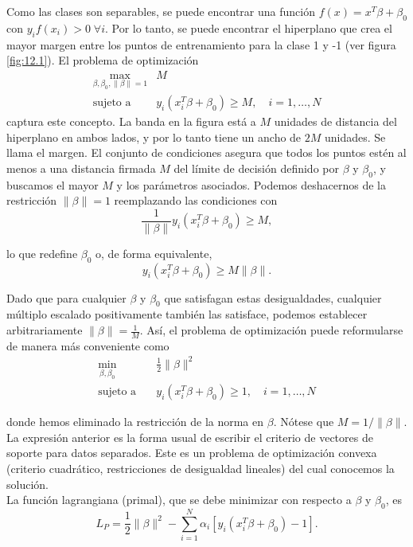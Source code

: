 Como las clases son separables, se puede encontrar una función $f(x) = x^T\beta + \beta_0$ con $y_i f(x_i) > 0 \; \forall i$. Por lo tanto, se puede encontrar el hiperplano que crea el mayor margen entre los puntos de entrenamiento para la clase 1 y -1 (ver figura \ref{fig:12.1}). El problema de optimización 
\begin{align}
\max_{\beta, \beta_0, \|\beta\|=1} & M \\
\text{sujeto a} \quad & y_i (x_i^T \beta + \beta_0) \geq M, \quad i = 1, \ldots, N
\end{align}
captura este concepto. La banda en la figura está a $M$ unidades de distancia del hiperplano en ambos lados, y por lo tanto tiene un ancho de $2M$ unidades. Se llama el margen. El conjunto de condiciones asegura que todos los puntos estén al menos a una distancia firmada $M$ del límite de decisión definido por $\beta$ y $\beta_0$, y buscamos el mayor $M$ y los parámetros asociados. Podemos deshacernos de la restricción $\|\beta\| = 1$ reemplazando las condiciones con
\begin{equation}
\frac{1}{\|\beta\|} y_i (x_i^T \beta + \beta_0) \geq M,
\end{equation}

\noindent lo que redefine $\beta_0$ o, de forma equivalente,
\begin{equation}
y_i (x_i^T \beta + \beta_0) \geq M \|\beta\|.
\end{equation}

Dado que para cualquier $\beta$ y $\beta_0$ que satisfagan estas desigualdades, cualquier múltiplo escalado positivamente también las satisface, podemos establecer arbitrariamente $\|\beta\| = \frac{1}{M}$. Así, el problema de optimización puede reformularse de manera más conveniente como
\begin{align}
\min_{\beta, \beta_0} & \frac{1}{2} \|\beta\|^2 \\
\text{sujeto a} \quad & y_i (x_i^T \beta + \beta_0) \geq 1, \quad i = 1, \ldots, N
\end{align}

donde hemos eliminado la restricción de la norma en $\beta$. Nótese que $M = 1/\|\beta\|$. La expresión anterior es la forma usual de escribir el criterio de vectores de soporte para datos separados. Este es un problema de optimización convexa (criterio cuadrático, restricciones de desigualdad lineales) del cual conocemos la solución. \\

\noindent La función lagrangiana (primal), que se debe minimizar con respecto a $\beta$ y $\beta_0$, es
\begin{equation}
L_P = \frac{1}{2} \|\beta\|^2 - \sum_{i=1}^N \alpha_i [y_i (x_i^T \beta + \beta_0) - 1].
\end{equation}

